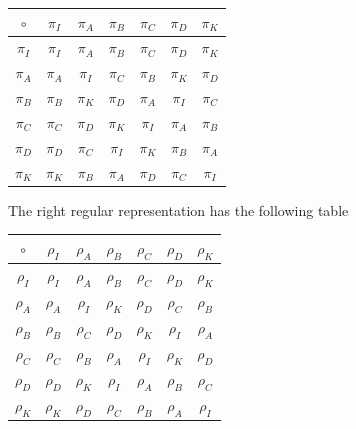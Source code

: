 \documentclass[twoside]{amsart}
\begin{document}
\begin{enumerate}[A.]
\begin{enumerate}[1]
      \begin{center}
      \begin{tabular}{c|cccccc}
         $\circ$ & $\pi_I$ & $\pi_A$ & $\pi_B$ & $\pi_C$ & $\pi_D$ & $\pi_K$\\
            \hline
         $\pi_I$ & $\pi_I$ & $\pi_A$ & $\pi_B$ & $\pi_C$ & $\pi_D$ & $\pi_K$\\
         $\pi_A$ & $\pi_A$ & $\pi_I$ & $\pi_C$ & $\pi_B$ & $\pi_K$ & $\pi_D$\\
         $\pi_B$ & $\pi_B$ & $\pi_K$ & $\pi_D$ & $\pi_A$ & $\pi_I$ & $\pi_C$\\
         $\pi_C$ & $\pi_C$ & $\pi_D$ & $\pi_K$ & $\pi_I$ & $\pi_A$ & $\pi_B$\\
         $\pi_D$ & $\pi_D$ & $\pi_C$ & $\pi_I$ & $\pi_K$ & $\pi_B$ & $\pi_A$\\
         $\pi_K$ & $\pi_K$ & $\pi_B$ & $\pi_A$ & $\pi_D$ & $\pi_C$ & $\pi_I$\\
      \end{tabular}
      \end{center}

      The right regular representation has the following table

      \begin{center}
      \begin{tabular}{c|cccccc}
   $\circ$ & $\rho_I$ & $\rho_A$ & $\rho_B$ & $\rho_C$ & $\rho_D$ & $\rho_K$\\
      \hline
   $\rho_I$ & $\rho_I$ & $\rho_A$ & $\rho_B$ & $\rho_C$ & $\rho_D$ & $\rho_K$\\
   $\rho_A$ & $\rho_A$ & $\rho_I$ & $\rho_K$ & $\rho_D$ & $\rho_C$ & $\rho_B$\\
   $\rho_B$ & $\rho_B$ & $\rho_C$ & $\rho_D$ & $\rho_K$ & $\rho_I$ & $\rho_A$\\
   $\rho_C$ & $\rho_C$ & $\rho_B$ & $\rho_A$ & $\rho_I$ & $\rho_K$ & $\rho_D$\\
   $\rho_D$ & $\rho_D$ & $\rho_K$ & $\rho_I$ & $\rho_A$ & $\rho_B$ & $\rho_C$\\
   $\rho_K$ & $\rho_K$ & $\rho_D$ & $\rho_C$ & $\rho_B$ & $\rho_A$ & $\rho_I$\\
      \end{tabular}
      \end{center}
      

   \end{enumerate}

\end{enumerate}
\end{document}
